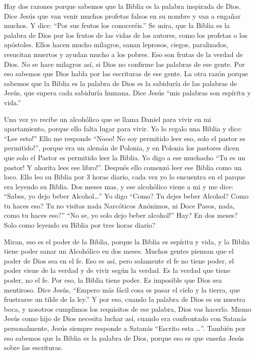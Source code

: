 Hay dos razones porque sabemos que la Biblia es la palabra inspirada de
Dios. Dice Jesús que van venir muchos profetas falsos en su nombre y van
a engañar muchos. Y dice: ``Por sus frutos los conoceréis.'' Se mira,
que la Biblia es la palabra de Dios por los frutos de las vidas de los
autores, como los profetas o los apóstoles. Ellos hacen mucho milagros,
sanan leprosos, ciegos, paralizados, resucitan muertos y ayudan mucho a
los pobres. Eso son frutas de la verdad de Dios. No se hace milagros
así, si Dios no confirme las palabras de ese gente. Por eso sabemos que
Dios habla por las escrituras de ese gente. La otra razón porque sabemos
que la Biblia es la palabra de Dios es la sabiduría de las palabras de
Jesús, que supera cada sabiduría humana. Dice Jesús ``mis palabras son
espíritu y vida.''

Una vez yo recibe un alcohólico que se llama Daniel para vivir en mi
apartamiento, porque ello falta lugar para vivir. Yo lo regalo una
Biblia y dice: ``Lee esto!'' Ello me responde ``Nooo! No soy permitido
leer eso, solo el pastor es permitido!'', porque era un alemán de
Polonia, y en Polonia los pastores dicen que solo el Pastor es permitido
leer la Biblia. Yo digo a ese muchacho ``Tu es un pastor! Y ahorita lees
ese libro!''. Después ello comenzó leer ese Biblia como un loco. Ello
leo su Biblia por 3 horas diario, cada vez yo lo encuentra en el parque
era leyendo su Biblia. Dos meses mas, y ese alcohólico viene a mi y me
dice: ``Sabes, yo dejo beber Alcohol\ldots{}'' Yo digo ``Como? Tu dejes
beber Alcohol? Como tu haces eso? Tu no visitas nada Narcóticos
Anónimos, ni Doce Pasos, nada, como tu haces eso?'' ``No se, yo solo
dejo beber alcohol!'' Hay? En dos meses? Solo como leyendo su Biblia por
tres horas diario?

Miran, eso es el poder de la Biblia, porque la Biblia es espíritu y
vida, y la Biblia tiene poder sanar un Alcohólico en dos meses. Muchos
gentes piensan que el poder de Dios sea en el fe. Eso es así, pero
solamente el fe no tiene poder, el poder viene de la verdad y de vivir
según la verdad. Es la verdad que tiene poder, no el fe. Por eso, la
Biblia tiene poder. Es imposible que Dios sea mentiroso. Dice Jesús,
``Empero más fácil cosa es pasar el cielo y la tierra, que frustrarse un
tilde de la ley.'' Y por eso, cuando la palabra de Dios es en nuestra
boca, y nosotros cumplimos los requisitos de ese palabra, Dios vas
hacerlo. Mismo Jesús como hijo de Dios necesita luchar así, cuando era
confrontado con Satanás personalmente, Jesús siempre responde a Satanás
``Escrito esta \ldots{}''. También por eso sabemos que la Biblia es la
palabra de Dios, porque eso es que enseña Jesús sobre las escrituras.

